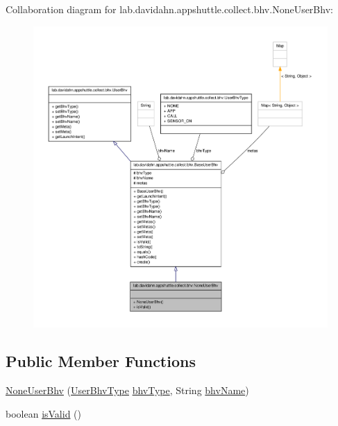 \-Collaboration diagram for lab.\-davidahn.\-appshuttle.\-collect.\-bhv.\-None\-User\-Bhv\-:
\nopagebreak
\begin{figure}[H]
\begin{center}
\leavevmode
\includegraphics[width=350pt]{classlab_1_1davidahn_1_1appshuttle_1_1collect_1_1bhv_1_1_none_user_bhv__coll__graph}
\end{center}
\end{figure}
\subsection*{\-Public \-Member \-Functions}
\begin{DoxyCompactItemize}
\item 
\hyperlink{classlab_1_1davidahn_1_1appshuttle_1_1collect_1_1bhv_1_1_none_user_bhv_a67edf679c7112ad19310e305368cfc02}{\-None\-User\-Bhv} (\hyperlink{enumlab_1_1davidahn_1_1appshuttle_1_1collect_1_1bhv_1_1_user_bhv_type}{\-User\-Bhv\-Type} \hyperlink{classlab_1_1davidahn_1_1appshuttle_1_1collect_1_1bhv_1_1_base_user_bhv_a29dae66ba4bf89a75849d77a35a57cb2}{bhv\-Type}, \-String \hyperlink{classlab_1_1davidahn_1_1appshuttle_1_1collect_1_1bhv_1_1_base_user_bhv_aa211c66df8abf7df665859d662891cc0}{bhv\-Name})
\item 
boolean \hyperlink{classlab_1_1davidahn_1_1appshuttle_1_1collect_1_1bhv_1_1_none_user_bhv_a3855dccd3675d88bfe773efd4fc417fe}{is\-Valid} ()
\end{DoxyCompactItemize}


